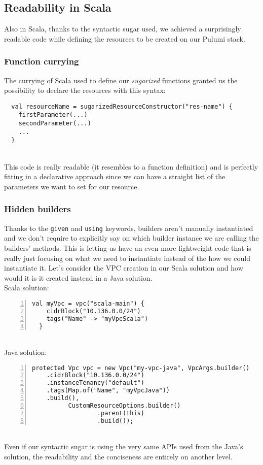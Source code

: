 \subsection{Readability in Scala}
Also in Scala, thanks to the syntactic sugar used, we achieved a surprisingly readable code while defining the resources to be created on our Pulumi stack.

\subsubsection{Function currying}
The currying of Scala used to define our \textit{sugarized} functions granted us the possibility to declare the resources with this syntax:
\begin{verbatim}
  val resourceName = sugarizedResourceConstructor("res-name") {
    firstParameter(...)
    secondParameter(...)
    ...
  }
\end{verbatim}\mbox{}\\
This code is really readable (it resembles to a function definition) and is perfectly fitting in a declarative approach since we can have a straight list of the parameters we want to set for our resource.\\

\subsubsection{Hidden builders}
Thanks to the \texttt{given} and \texttt{using} keywords, builders aren't manually instantiated and we don't require to explicitly say on which builder instance we are calling the builders' methods.
This is letting us have an even more lightweight code that is really just focusing on what we need to instantiate instead of the how we could instantiate it.
Let's consider the VPC creation in our Scala solution and how would it is it created instead in a Java solution.\\
Scala solution:
\begin{lstlisting}[numbers=left, numberstyle=\tiny, numbersep=-5pt, stepnumber=1]
  val myVpc = vpc("scala-main") {
    cidrBlock("10.136.0.0/24")
    tags("Name" -> "myVpcScala")
  }
\end{lstlisting}\mbox{}\\
Java solution:
\begin{lstlisting}[numbers=left, numberstyle=\tiny, numbersep=-5pt, stepnumber=1]
  protected Vpc vpc = new Vpc("my-vpc-java", VpcArgs.builder()
    .cidrBlock("10.136.0.0/24")
    .instanceTenancy("default")
    .tags(Map.of("Name", "myVpcJava"))
    .build(),
          CustomResourceOptions.builder()
                  .parent(this)
                  .build());
\end{lstlisting}\mbox{}\\
Even if our syntactic sugar is using the very same APIs used from the Java's solution, the readability and the conciseness are entirely on another level.

